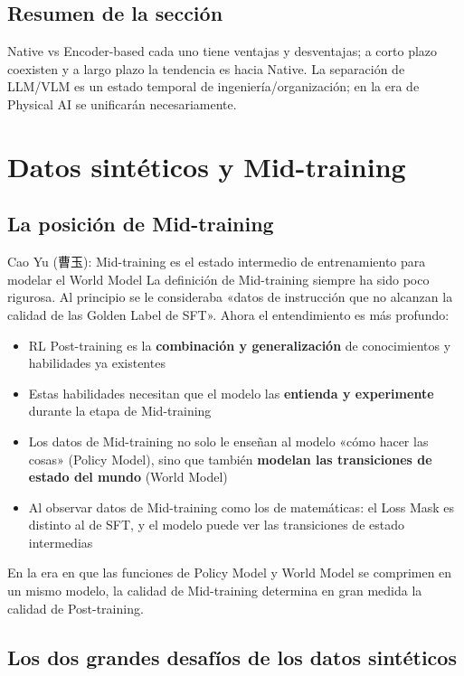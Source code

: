 \documentclass[a4paper]{article}
\begin{document}
\subsection{Resumen de la sección}
Native vs Encoder-based cada uno tiene ventajas y desventajas; a corto plazo coexisten y a largo plazo la tendencia es hacia Native. La separación de LLM/VLM es un estado temporal de ingeniería/organización; en la era de Physical AI se unificarán necesariamente.

\section{Datos sintéticos y Mid-training}

\subsection{La posición de Mid-training}

\begin{importantbox}{Cao Yu (曹玉): Mid-training es el estado intermedio de entrenamiento para modelar el World Model}
La definición de Mid-training siempre ha sido poco rigurosa. Al principio se le consideraba «datos de instrucción que no alcanzan la calidad de las Golden Label de SFT». Ahora el entendimiento es más profundo:
\begin{itemize}
  \item RL Post-training es la \textbf{combinación y generalización} de conocimientos y habilidades ya existentes
  \item Estas habilidades necesitan que el modelo las \textbf{entienda y experimente} durante la etapa de Mid-training
  \item Los datos de Mid-training no solo le enseñan al modelo «cómo hacer las cosas» (Policy Model), sino que también \textbf{modelan las transiciones de estado del mundo} (World Model)
  \item Al observar datos de Mid-training como los de matemáticas: el Loss Mask es distinto al de SFT, y el modelo puede ver las transiciones de estado intermedias
\end{itemize}
En la era en que las funciones de Policy Model y World Model se comprimen en un mismo modelo, la calidad de Mid-training determina en gran medida la calidad de Post-training.
\end{importantbox}

\subsection{Los dos grandes desafíos de los datos sintéticos}
\end{document}
